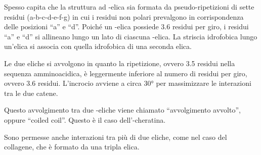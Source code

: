 \begingroup{} \endgroup

Spesso capita che la struttura ad \alpha-elica sia formata da
pseudo-ripetizioni di sette residui (a-b-c-d-e-f-g) in cui i residui non
polari prevalgono in corrispondenza delle posizioni ``a'' e ``d''.
Poiché un \alpha-elica possiede 3.6 residui per giro, i residui ``a'' e
``d'' si allineano lungo un lato di ciascuna \alpha-elica. La striscia
idrofobica lungo un'elica si associa con quella idrofobica di una
seconda elica.


Le due eliche si avvolgono in quanto la ripetizione, ovvero 3.5 residui
nella sequenza amminoacidica, è leggermente inferiore al numero di
residui per giro, ovvero 3.6 residui. L'incrocio avviene a circa 30° per
massimizzare le interazioni tra le due catene.

Questo avvolgimento tra due \alpha-eliche viene chiamato ``avvolgimento
avvolto'', oppure ``coiled coil''. Questo è il caso
dell'\alpha-cheratina.


Sono permesse anche interazioni tra più di due eliche, come nel caso del
collagene, che è formato da una tripla elica.



